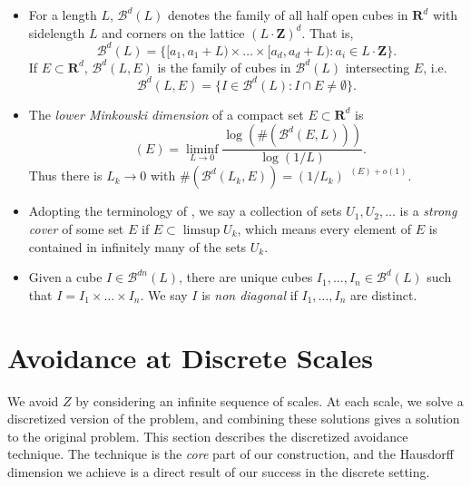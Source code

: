 \documentclass[usenames,dvipsnames]{article}
\theoremstyle{plain}
\theoremstyle{plain}
\DeclareMathOperator{\lhdim}{\underline{\dim}_{\mathbf{M}}}
\DeclareMathOperator{\lmbdim}{\underline{\dim}_{\mathbf{MB}}}
\begin{document}
\begin{itemize}
	\item For a length $L$, $\mathcal{B}^d(L)$ denotes the family of all half open cubes in $\mathbf{R}^d$ with sidelength $L$ and corners on the lattice $(L \cdot \mathbf{Z})^d$. That is,
	\[ \mathcal{B}^d(L) = \{ [a_1,a_1 + L) \times \dots \times [a_d, a_d + L) : a_i \in L \cdot \mathbf{Z} \}. \]
	If $E \subset \mathbf{R}^d$, $\mathcal{B}^d(L,E)$ is the family of cubes in $\mathcal{B}^d(L)$ intersecting $E$, i.e.
	\[\mathcal{B}^d(L,E) = \{ I \in \mathcal{B}^d(L): I \cap E \neq \emptyset \}. \]

	\item The {\it lower Minkowski dimension} of a compact set $E \subset \mathbf{R}^d$ is
	\[ \lhdim(E) = \liminf_{L \to 0} \frac{\log( \#( \mathcal{B}^d(E,L) ) )}{\log(1/L)}. \]
	Thus there is $L_k \to 0$ with $\# ( \mathcal{B}^d(L_k,E) ) = (1/L_k)^{\lhdim(E) + o(1)}$.


	\item Adopting the terminology of \cite{KatzTao}, we say a collection of sets $U_1, U_2, \dots$ is a {\it strong cover} of some set $E$ if $E \subset \limsup U_k$, which means every element of $E$ is contained in infinitely many of the sets $U_k$.

	\item Given a cube $I \in \mathcal{B}^{dn}(L)$, there are unique cubes $I_1, \dots, I_n \in \mathcal{B}^d(L)$ such that $I = I_1 \times \dots \times I_n$. We say $I$ is {\it non diagonal} if $I_1, \dots, I_n$ are distinct.
\end{itemize}

\section{Avoidance at Discrete Scales}

We avoid $Z$ by considering an infinite sequence of scales. At each scale, we solve a discretized version of the problem, and combining these solutions gives a solution to the original problem. This section describes the discretized avoidance technique. The technique is the {\it core} part of our construction, and the Hausdorff dimension we achieve is a direct result of our success in the discrete setting.
\end{document}
